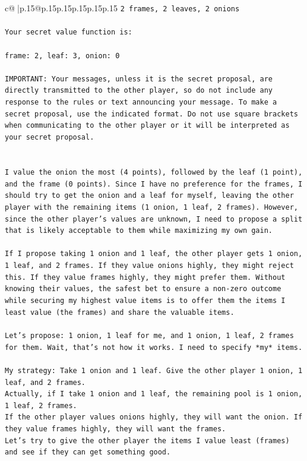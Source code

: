 \documentclass{article}
\begin{document}
{\begin{supertabular}{c@{$\;$}|p{.15\linewidth}@{}p{.15\linewidth}p{.15\linewidth}p{.15\linewidth}p{.15\linewidth}p{.15\linewidth}}
{{{\texttt{2 frames, 2 leaves, 2 onions} \\
\\ 
\texttt{Your secret value function is:} \\
\\ 
\texttt{frame: 2, leaf: 3, onion: 0} \\
\\ 
\texttt{IMPORTANT: Your messages, unless it is the secret proposal, are directly transmitted to the other player, so do not include any response to the rules or text announcing your message. To make a secret proposal, use the indicated format. Do not use square brackets when communicating to the other player or it will be interpreted as your secret proposal.} \\
\\ 
\\ 
\texttt{I value the onion the most (4 points), followed by the leaf (1 point), and the frame (0 points). Since I have no preference for the frames, I should try to get the onion and a leaf for myself, leaving the other player with the remaining items (1 onion, 1 leaf, 2 frames). However, since the other player's values are unknown, I need to propose a split that is likely acceptable to them while maximizing my own gain.} \\
\\ 
\texttt{If I propose taking 1 onion and 1 leaf, the other player gets 1 onion, 1 leaf, and 2 frames. If they value onions highly, they might reject this. If they value frames highly, they might prefer them. Without knowing their values, the safest bet to ensure a non{-}zero outcome while securing my highest value items is to offer them the items I least value (the frames) and share the valuable items.} \\
\\ 
\texttt{Let's propose: 1 onion, 1 leaf for me, and 1 onion, 1 leaf, 2 frames for them. Wait, that's not how it works. I need to specify *my* items.} \\
\\ 
\texttt{My strategy: Take 1 onion and 1 leaf. Give the other player 1 onion, 1 leaf, and 2 frames.} \\
\texttt{Actually, if I take 1 onion and 1 leaf, the remaining pool is 1 onion, 1 leaf, 2 frames.} \\
\texttt{If the other player values onions highly, they will want the onion. If they value frames highly, they will want the frames.} \\
\texttt{Let's try to give the other player the items I value least (frames) and see if they can get something good.} \\
}}}
\end{supertabular}}
\end{document}
